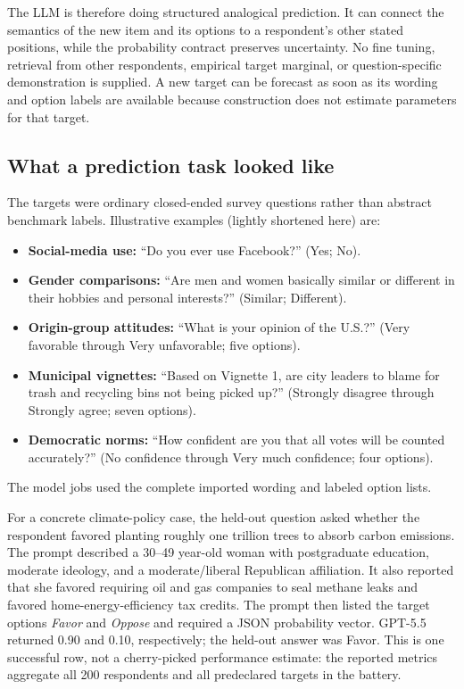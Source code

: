 \documentclass[11pt]{article}
\begin{document}
The LLM is therefore doing structured analogical prediction. It can connect
the semantics of the new item and its options to a respondent's other stated
positions, while the probability contract preserves uncertainty. No fine
tuning, retrieval from other respondents, empirical target marginal, or
question-specific demonstration is supplied. A new target can be forecast as
soon as its wording and option labels are available because construction does
not estimate parameters for that target.

\subsection{What a prediction task looked like}
The targets were ordinary closed-ended survey questions rather than abstract
benchmark labels. Illustrative examples (lightly shortened here) are:
\begin{itemize}[leftmargin=1.5em,itemsep=2pt,topsep=3pt]
  \item \textbf{Social-media use:} ``Do you ever use Facebook?'' (Yes; No).
  \item \textbf{Gender comparisons:} ``Are men and women basically similar or
  different in their hobbies and personal interests?'' (Similar; Different).
  \item \textbf{Origin-group attitudes:} ``What is your opinion of the U.S.?''
  (Very favorable through Very unfavorable; five options).
  \item \textbf{Municipal vignettes:} ``Based on Vignette 1, are city leaders
  to blame for trash and recycling bins not being picked up?'' (Strongly
  disagree through Strongly agree; seven options).
  \item \textbf{Democratic norms:} ``How confident are you that all votes will
  be counted accurately?'' (No confidence through Very much confidence; four
  options).
\end{itemize}
The model jobs used the complete imported wording and labeled option lists.

For a concrete climate-policy case, the held-out question asked whether the
respondent favored planting roughly one trillion trees to absorb carbon
emissions. The prompt described a 30--49 year-old woman with postgraduate
education, moderate ideology, and a moderate/liberal Republican affiliation.
It also reported that she favored requiring oil and gas companies to seal
methane leaks and favored home-energy-efficiency tax credits. The prompt then
listed the target options \emph{Favor} and \emph{Oppose} and required a JSON
probability vector. GPT-5.5 returned 0.90 and 0.10, respectively; the held-out
answer was Favor. This is one successful row, not a cherry-picked performance
estimate: the reported metrics aggregate all 200 respondents and all
predeclared targets in the battery.
\end{document}
